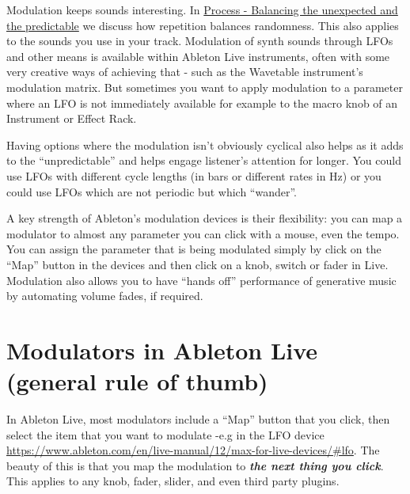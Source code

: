\documentclass[
  12pt,
  letterpaper,
  oneside,
  open=any]{scrbook}
\begin{document}
\begin{tcolorbox}[enhanced jigsaw, breakable, left=2mm, leftrule=.75mm, toprule=.15mm, opacitybacktitle=0.6, toptitle=1mm, coltitle=black, colback=white, colbacktitle=quarto-callout-tip-color!10!white, opacityback=0, rightrule=.15mm, bottomrule=.15mm, titlerule=0mm, title=\textcolor{quarto-callout-tip-color}{\faLightbulb}\hspace{0.5em}{Key idea}, arc=.35mm, bottomtitle=1mm, colframe=quarto-callout-tip-color-frame]

Modulation keeps sounds interesting. In
\hyperref[Chapter-008-Process-Balance_unexpected_and_predictable]{Process
- Balancing the unexpected and the predictable} we discuss how
repetition balances randomness. This also applies to the sounds you use
in your track. Modulation of synth sounds through LFOs and other means
is available within Ableton Live instruments, often with some very
creative ways of achieving that - such as the Wavetable instrument's
modulation matrix. But sometimes you want to apply modulation to a
parameter where an LFO is not immediately available for example to the
macro knob of an Instrument or Effect Rack.

Having options where the modulation isn't obviously cyclical also helps
as it adds to the ``unpredictable'' and helps engage listener's
attention for longer. You could use LFOs with different cycle lengths
(in bars or different rates in Hz) or you could use LFOs which are not
periodic but which ``wander''.

A key strength of Ableton's modulation devices is their flexibility: you
can map a modulator to almost any parameter you can click with a mouse,
even the tempo. You can assign the parameter that is being modulated
simply by click on the ``Map'' button in the devices and then click on a
knob, switch or fader in Live. Modulation also allows you to have
``hands off'' performance of generative music by automating volume
fades, if required.

\end{tcolorbox}

\section{Modulators in Ableton Live (general rule of
thumb)}\label{modulators-in-ableton-live-general-rule-of-thumb}

In Ableton Live, most modulators include a ``Map'' button that you
click, then select the item that you want to modulate -e.g in the LFO
device
\url{https://www.ableton.com/en/live-manual/12/max-for-live-devices/\#lfo}.
The beauty of this is that you map the modulation to \textbf{\emph{the
next thing you click}}. This applies to any knob, fader, slider, and
even third party plugins.
\end{document}
